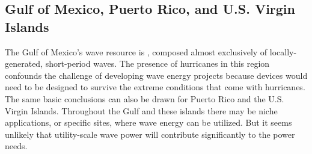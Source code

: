 \subsection{Gulf of Mexico, Puerto Rico, and U.S. Virgin Islands}

The Gulf of Mexico's wave resource is \DIFdelbegin {}\DIFdelend \DIFaddbegin {}\DIFaddend , composed almost exclusively of locally-generated, short-period waves.  The \DIFaddbegin {}\DIFaddend presence of hurricanes in this region confounds the challenge of developing wave energy projects because devices would need to be designed to survive the extreme conditions that come with hurricanes. The same basic conclusions can also be drawn for Puerto Rico and the U.S. Virgin Islands. Throughout the Gulf and these islands there may be niche applications, or specific sites, where wave energy can be utilized. But it seems unlikely that utility-scale wave power will contribute significantly to the power needs.





